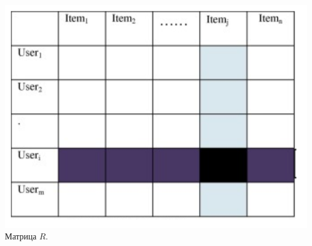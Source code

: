 \documentclass{article}
\begin{document}
 \includegraphics[width=\linewidth]{f2.png}\\
 Матрица $R$.
\end{document}
